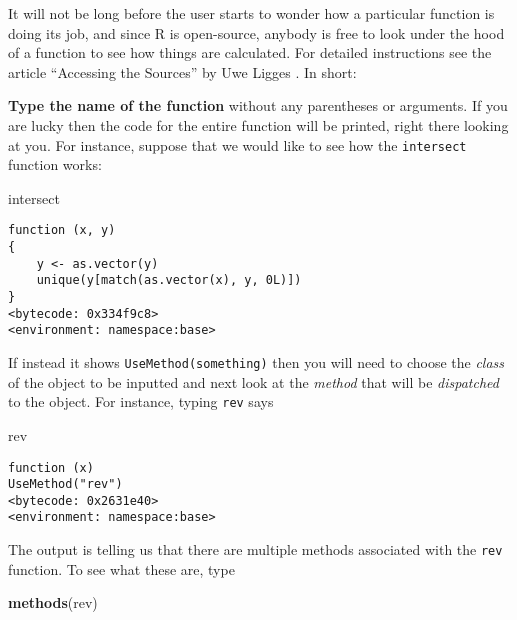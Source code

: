 \documentclass[]{book}
\newenvironment{Shaded}{\begin{snugshade}}{\end{snugshade}}
\newcommand{\KeywordTok}[1]{\textcolor[rgb]{0.13,0.29,0.53}{\textbf{{#1}}}}
\newcommand{\NormalTok}[1]{{#1}}
\numberwithin{equation}{chapter}
\numberwithin{figure}{chapter}
\theoremstyle{plain}
\theoremstyle{definition}
\theoremstyle{remark}
\theoremstyle{definition}
\theoremstyle{definition}
\theoremstyle{remark}
\begin{document}
It will not be long before the user starts to wonder how a particular
function is doing its job, and since R is open-source, anybody is free
to look under the hood of a function to see how things are calculated.
For detailed instructions see the article ``Accessing the Sources'' by
Uwe Ligges \autocite{Ligges2006}. In short:

\textbf{Type the name of the function} without any parentheses or
arguments. If you are lucky then the code for the entire function will
be printed, right there looking at you. For instance, suppose that we
would like to see how the \texttt{intersect}
 function works:

\begin{Shaded}
\begin{Highlighting}[]
\NormalTok{intersect}
\end{Highlighting}
\end{Shaded}

\begin{verbatim}
function (x, y) 
{
    y <- as.vector(y)
    unique(y[match(as.vector(x), y, 0L)])
}
<bytecode: 0x334f9c8>
<environment: namespace:base>
\end{verbatim}

If instead it shows \texttt{UseMethod(something)}
 then you will need to choose the
\emph{class} of the object to be inputted and next look at the
\emph{method} that will be \emph{dispatched} to the object. For
instance, typing \texttt{rev}  says

\begin{Shaded}
\begin{Highlighting}[]
\NormalTok{rev}
\end{Highlighting}
\end{Shaded}

\begin{verbatim}
function (x) 
UseMethod("rev")
<bytecode: 0x2631e40>
<environment: namespace:base>
\end{verbatim}

The output is telling us that there are multiple methods associated with
the \texttt{rev} function. To see what these are, type

\begin{Shaded}
\begin{Highlighting}[]
\KeywordTok{methods}\NormalTok{(rev)}
\end{Highlighting}
\end{Shaded}
\end{document}

